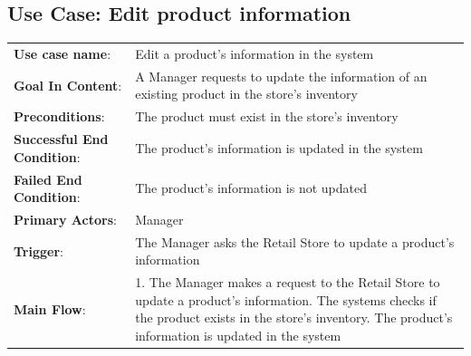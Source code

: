\documentclass[12pt]{article}
\begin{document}
\subsection*{Use Case: Edit product information}
\begin{center}
\begin{tabular}{ l p{} }
    \textbf{Use case name}: & Edit a product’s information in the system \\
    \textbf{Goal In Content}: & A Manager requests to update the information of an existing product in the store’s inventory \\
    \textbf{Preconditions}: & The product must exist in the store’s inventory \\
    \textbf{Successful End Condition}: & The product’s information is updated in the system \\
    \textbf{Failed End Condition}: & The product’s information is not updated  \\
    \textbf{Primary Actors}: & Manager  \\
    \textbf{Trigger}: & The Manager asks the Retail Store to update a product’s information  \\
    \textbf{Main Flow}: & 1. The Manager makes a request to the Retail Store to update a product’s information\newline 2. The systems checks if the product exists in the store’s inventory\newline 3. The product’s information is updated in the system
\end{tabular}
\end{center}
\end{document}
